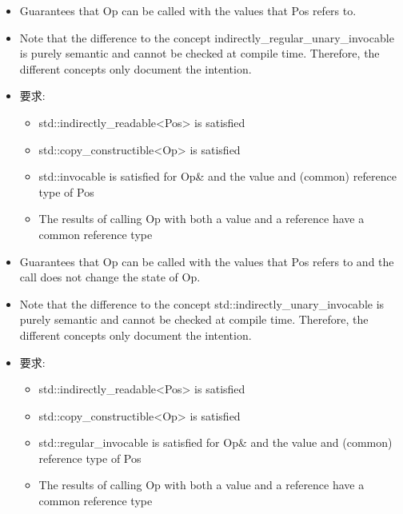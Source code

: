 

\begin{itemize}
\item
Guarantees that Op can be called with the values that Pos refers to.

\item
Note that the difference to the concept indirectly\_regular\_unary\_invocable is purely semantic and cannot be checked at compile time. Therefore, the different concepts only document the intention.

\item
要求:
\begin{itemize}
\item
std::indirectly\_readable<Pos> is satisfied

\item
std::copy\_constructible<Op> is satisfied

\item
std::invocable is satisfied for Op\& and the value and (common) reference type of Pos

\item
The results of calling Op with both a value and a reference have a common reference type
\end{itemize}
\end{itemize}


\begin{itemize}
\item
Guarantees that Op can be called with the values that Pos refers to and the call does not change the state of Op.

\item
Note that the difference to the concept std::indirectly\_unary\_invocable is purely semantic and cannot be checked at compile time. Therefore, the different concepts only document the intention.

\item
要求:
\begin{itemize}
\item
std::indirectly\_readable<Pos> is satisfied

\item
std::copy\_constructible<Op> is satisfied

\item
std::regular\_invocable is satisfied for Op\& and the value and (common) reference type of Pos

\item
The results of calling Op with both a value and a reference have a common reference type
\end{itemize}
\end{itemize}

